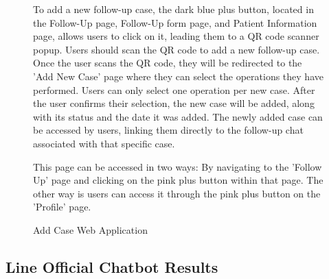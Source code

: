 \documentclass[12pt,oneside,openright,a4paper]{cpe-english-project}
\begin{document}
\begin{figure}[H]
            \caption{Add Case Web Application}\label{fig:WebAppAddCase}
            \begin{justify}
              \qquad To add a new follow-up case, the dark blue plus button, located in the Follow-Up page, Follow-Up form page, and Patient Information page, allows users to click on it, leading them to a QR code scanner popup. Users should scan the QR code to add a new follow-up case. Once the user scans the QR code, they will be redirected to the 'Add New Case' page where they can select the operations they have performed. Users can only select one operation per new case. After the user confirms their selection, the new case will be added, along with its status and the date it was added. The newly added case can be accessed by users, linking them directly to the follow-up chat associated with that specific case.\par
              \qquad This page can be accessed in two ways: By navigating to the 'Follow Up' page and clicking on the pink plus button within that page. The other way is users can access it through the pink plus button on the 'Profile' page.\par
            \end{justify}
          \end{figure}
      \subsection{Line Official Chatbot Results}
\end{document}
